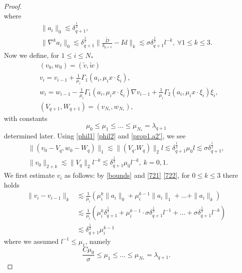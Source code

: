 \documentclass[reqno,12pt]{amsart}
\numberwithin{equation}{section}
\theoremstyle{plain}
\theoremstyle{definition}
\begin{document}
\begin{proof}
\begin{equation}
\end{equation}
where
\begin{gather}
    \|a_i\|_0\lesssim\delta_{q+1}^\frac{1}{2}, \label{721}\\
    \|\nabla^k a_i\|_0\lesssim\delta_{q+1}^\frac{1}{2}\|\frac{\tilde D}{\delta_{q+1}}-Id\|_k\lesssim \sigma\delta_{q+1}^\frac{1}{2}l^{-k},\ \forall 1\le k\le 3. \label{722}
\end{gather}
Now we define, for $1\le i\le N_*$
\begin{align}
    &(v_0, w_0)=(\tilde v, \tilde w)\\
    & v_i= v_{i-1}+\frac{1}{\mu_i}\Gamma_1(a_i, \mu_i x\cdot \xi_i),\\
    & w_i= w_{i-1}-\frac{1}{\mu_i}\Gamma_1(a_i,\mu_i x\cdot \xi_i)\nabla v_{i-1}+\frac{1}{\mu_i}\Gamma_2(a_i,\mu_i x\cdot \xi_i) \xi_i,\\
    & (V_{q+1},W_{q+1})=(v_{N_*},w_{N_*}),
\end{align}
with constants \begin{equation*}
\mu_0\le\mu_1\le...\le\mu_{N_*}=\lambda_{q+1}
\end{equation*}
determined later. Using \eqref{phil1} \eqref{phil2} and \eqref{prop1.a2'}, we see
\begin{gather}
    \|(v_0-V_q,w_0-W_q)\|_1\lesssim \|(V_q.W_q)\|_2 l\lesssim \delta_{q+1}^\frac{1}{2}\mu_0 l\lesssim \sigma\delta_{q+1}^\frac{1}{2},\label{401}\\
    \|v_0\|_{2+k}\lesssim \|V_q\|_2 l^{-k}\lesssim \delta_{q+1}^\frac{1}{2}\mu_0 l^{-k},\ k=0,1. \label{402}
\end{gather}
We first estimate $v_i$ as follows: by  \eqref{bounds} and \eqref{721} \eqref{722}, for $0\le k\le 3$ there holds
\begin{equation}\label{403}
\begin{aligned}
    \|v_i- v_{i-1}\|_k
    &\lesssim \frac{1}{\mu_i}(\mu_i^k\|a_i\|_0+\mu_i^{k-1}\|a_i\|_1+...+\|a_i\|_k)\\
    &\lesssim\frac{1}{\mu_i}(\mu_i^k\delta_{q+1}^\frac{1}{2}+\mu_i^{k-1}\cdot\sigma\delta_{q+1}^\frac{1}{2}l^{-1}+...+\sigma\delta_{q+1}^\frac{1}{2}l^{-k})\\
    &\lesssim \delta_{q+1}^\frac{1}{2}\mu_i^{k-1}
\end{aligned}
\end{equation}
where we assumed $l^{-1}\le\mu_1$, namely
\begin{equation}\label{ineq03}
    \frac{C\mu_0}{\sigma}\le\mu_1\le...\le\mu_{N_*}=\lambda_{q+1}.
\end{equation}

\end{proof}
\end{document}
